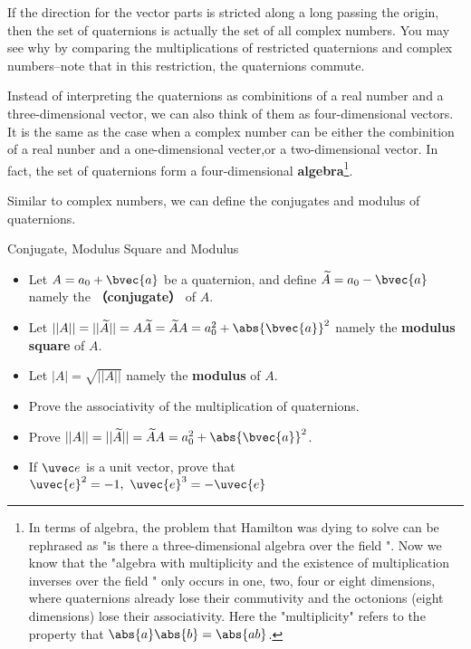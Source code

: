 If the direction for the vector parts is stricted along a long passing the origin, then the set of quaternions is actually the set of all complex numbers. You may see why by comparing the multiplications of restricted quaternions and complex numbers--note that in this restriction, the quaternions commute. 

Instead of interpreting the quaternions as combinitions of a real number and a three-dimensional vector, we can also think of them as four-dimensional vectors. It is the same as the case when a complex number can be either the combinition of a real nunber and a one-dimensional vecter,or a two-dimensional vector. In fact, the set of quaternions form a four-dimensional \textbf{algebra}\footnote{In terms of algebra, the problem that Hamilton was dying to solve can be rephrased as "is there a three-dimensional algebra over the field ". Now we know that the "algebra with multiplicity and the existence of multiplication inverses over the field " only occurs in one, two, four or eight dimensions, where quaternions already lose their commutivity and the octonions (eight dimensions) lose their associativity. Here the "multiplicity" refers to the property that $\abs{a}\abs{b}=\abs{ab}$. }.

Similar to complex numbers, we can define the conjugates and modulus of quaternions. 



\begin{definition}{Conjugate, Modulus Square and Modulus}
\begin{itemize}
\item Let $A=a_0+\bvec{a}$ be a quaternion, and define $\widetilde{A}=a_0-\bvec{a}$ namely the \textbf{（conjugate）} of $A$. 
\item Let $||A||=||\widetilde{A}||=A\widetilde{A}=\widetilde{A}A=a_0^2+ \abs{\bvec{a}}^2$ namely the \textbf{modulus square} of $A$. 
\item Let $|A|=\sqrt{||A||}$ namely the \textbf{modulus} of $A$. 
\end{itemize}
\end{definition}

\begin{exercise}{}\label{QuaRot_exe1}
\begin{itemize}
\item Prove the associativity of the multiplication of quaternions. 
\item Prove $||A||=||\widetilde{A}||=\widetilde{A}A=a_0^2 + \abs{\bvec{a}}^2$. 
\item If $\uvec e$ is a unit vector, prove that $\uvec{e}^2=-1,\ \uvec{e}^3=-\uvec{e}$
\end{itemize}
\end{exercise}

